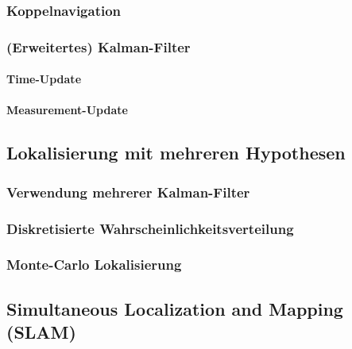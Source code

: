 \documentclass[a4paper, 11pt, accentcolor = tud3b]{tudreport}
\begin{document}
				\subsubsection{Koppelnavigation} %

				\subsubsection{(Erweitertes) Kalman-Filter} %

					\paragraph{Time-Update} %

					\paragraph{Measurement-Update} %

			\subsection{Lokalisierung mit mehreren Hypothesen} %

				\subsubsection{Verwendung mehrerer Kalman-Filter} %

				\subsubsection{Diskretisierte Wahrscheinlichkeitsverteilung} %

				\subsubsection{Monte-Carlo Lokalisierung} %

			\subsection{Simultaneous Localization and Mapping (SLAM)} %
\end{document}
